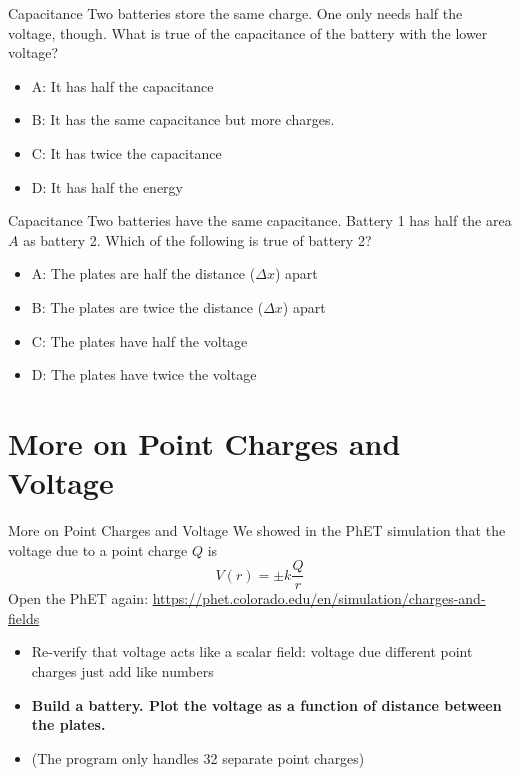 \documentclass{beamer}
\begin{document}
\begin{frame}{Capacitance}
Two batteries store the same charge.  One only needs half the voltage, though.  What is true of the capacitance of the battery with the lower voltage?
\begin{itemize}
\item A: It has half the capacitance
\item B: It has the same capacitance but more charges.
\item C: It has twice the capacitance
\item D: It has half the energy
\end{itemize}
\end{frame}

\begin{frame}{Capacitance}
Two batteries have the same capacitance.  Battery 1 has half the area $A$ as battery 2.  Which of the following is true of battery 2?
\begin{itemize}
\item A: The plates are half the distance ($\Delta x$) apart
\item B: The plates are twice the distance ($\Delta x$) apart
\item C: The plates have half the voltage
\item D: The plates have twice the voltage
\end{itemize}
\end{frame}

\section{More on Point Charges and Voltage}

\begin{frame}{More on Point Charges and Voltage}
We showed in the PhET simulation that the voltage due to a point charge $Q$ is
\begin{equation}
\boxed{
V(r) = \pm k\frac{Q}{r}
}
\end{equation}
Open the PhET again: \url{https://phet.colorado.edu/en/simulation/charges-and-fields}
\begin{itemize}
\item Re-verify that voltage acts like a scalar field: voltage due different point charges just add like numbers
\item \textbf{\alert{Build a battery.  Plot the voltage as a function of distance between the plates.}}
\item (The program only handles 32 separate point charges)
\end{itemize}
\end{frame}
\end{document}
